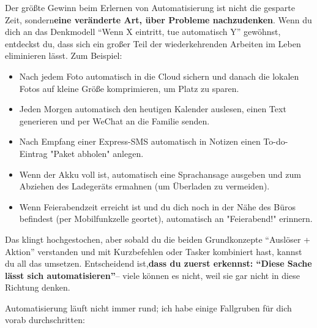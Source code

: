 
Der größte Gewinn beim Erlernen von Automatisierung ist nicht die gesparte Zeit, sondern\textbf{eine veränderte Art, über Probleme nachzudenken}. Wenn du dich an das Denkmodell “Wenn X eintritt, tue automatisch Y” gewöhnst, entdeckst du, dass sich ein großer Teil der wiederkehrenden Arbeiten im Leben eliminieren lässt. Zum Beispiel:

\begin{itemize}
  \item Nach jedem Foto automatisch in die Cloud sichern und danach die lokalen Fotos auf kleine Größe komprimieren, um Platz zu sparen.
  \item Jeden Morgen automatisch den heutigen Kalender auslesen, einen Text generieren und per WeChat an die Familie senden.
  \item Nach Empfang einer Express-SMS automatisch in Notizen einen To-do-Eintrag "Paket abholen" anlegen.
  \item Wenn der Akku voll ist, automatisch eine Sprachansage ausgeben und zum Abziehen des Ladegeräts ermahnen (um Überladen zu vermeiden).
  \item Wenn Feierabendzeit erreicht ist und du dich noch in der Nähe des Büros befindest (per Mobilfunkzelle geortet), automatisch an "Feierabend!" erinnern.
\end{itemize}

Das klingt hochgestochen, aber sobald du die beiden Grundkonzepte “Auslöser + Aktion” verstanden und mit Kurzbefehlen oder Tasker kombiniert hast, kannst du all das umsetzen. Entscheidend ist,\textbf{dass du zuerst erkennst: “Diese Sache lässt sich automatisieren”}– viele können es nicht, weil sie gar nicht in diese Richtung denken.


Automatisierung läuft nicht immer rund; ich habe einige Fallgruben für dich vorab durchschritten:


